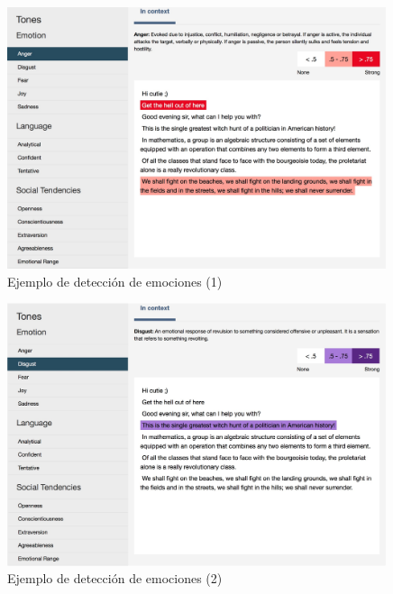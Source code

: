 \documentclass[compress]{beamer}
\begin{document}
\begin{frame}
	\begin{figure}[H]
		\centering
		\label{anger.jpg}
		\includegraphics[width=0.99\textwidth]{./Imagenes/anger.jpeg}
		\caption{Ejemplo de detección de emociones (1)}
	\end{figure}
\end{frame}

\begin{frame}
	\begin{figure}[H]
		\centering
		\label{disgust.jpg}
		\includegraphics[width=0.99\textwidth]{./Imagenes/disgust.jpeg}
		\caption{Ejemplo de detección de emociones (2)}
	\end{figure}
\end{frame}
\end{document}
